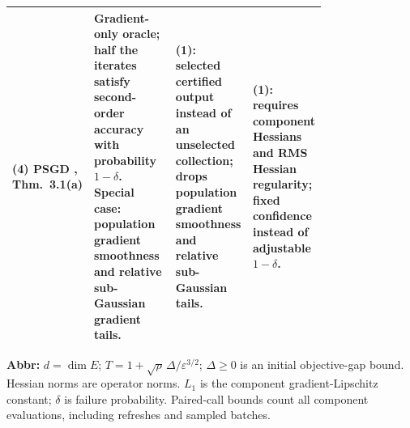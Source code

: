 \begin{table}[tp]
\begin{threeparttable}
\begin{tabularx}{\linewidth}{@{}>{\raggedright\arraybackslash}p{0.20\linewidth}>{\raggedright\arraybackslash}p{0.32\linewidth}>{\raggedright\arraybackslash}p{0.25\linewidth}>{\raggedright\arraybackslash}X@{}}
\midrule
\textbf{(4)} PSGD \citep{sgRoy2020}, Thm.~3.1(a) & Gradient-only oracle; half the iterates satisfy second-order accuracy with probability $1-\delta$. Special case: population gradient smoothness and relative sub-Gaussian gradient tails. & \textbf{(1)}: selected certified output instead of an unselected collection; drops population gradient smoothness and relative sub-Gaussian tails. & \textbf{(1)}: requires component Hessians and RMS Hessian regularity; fixed confidence instead of adjustable $1-\delta$. \\
\bottomrule
\end{tabularx}
\begin{tablenotes}[flushleft]\footnotesize
\item[] \textbf{Abbr:} $d=\dim E$; $T=1+\sqrt\rho\,\Delta/\varepsilon^{3/2}$; $\Delta\ge0$ is an initial objective-gap bound. Hessian norms are operator norms. $L_1$ is the component gradient-Lipschitz constant; $\delta$ is failure probability. Paired-call bounds count all component evaluations, including refreshes and sampled batches.
\end{tablenotes}
\end{threeparttable}
\end{table}
\clearpage
